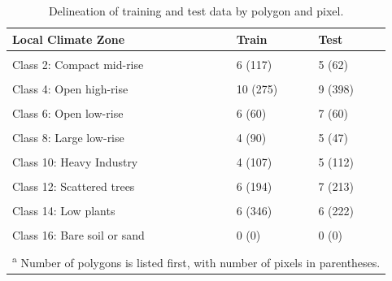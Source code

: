 \documentclass[
]{article}
\begin{document}
\begin{table}[H]

\caption{\label{tab:unnamed-chunk-1}Delineation of training and test data by polygon and pixel.}
\centering
\fontsize{8}{10}\selectfont
\begin{tabular}[t]{lll}
\toprule
Local Climate Zone & Train & Test\\
\midrule
\cellcolor{gray!6}{Class 1: Compact high-rise} & \cellcolor{gray!6}{13        (295)} & \cellcolor{gray!6}{13 (336)}\\
Class 2: Compact mid-rise & 6        (117) & 5 (62)\\
\cellcolor{gray!6}{Class 3: Compact low-rise} & \cellcolor{gray!6}{7        (185)} & \cellcolor{gray!6}{7 (141)}\\
Class 4: Open high-rise & 10        (275) & 9 (398)\\
\cellcolor{gray!6}{Class 5: Open mid-rise} & \cellcolor{gray!6}{4        (79)} & \cellcolor{gray!6}{4 (47)}\\
Class 6: Open low-rise & 6        (60) & 7 (60)\\
\cellcolor{gray!6}{Class 7: Lightweight low-rise} & \cellcolor{gray!6}{0        (0)} & \cellcolor{gray!6}{0 (0)}\\
Class 8: Large low-rise & 4        (90) & 5 (47)\\
\cellcolor{gray!6}{Class 9: Sparsely built} & \cellcolor{gray!6}{0        (0)} & \cellcolor{gray!6}{0 (0)}\\
Class 10: Heavy Industry & 4        (107) & 5 (112)\\
\cellcolor{gray!6}{Class 11: Dense trees} & \cellcolor{gray!6}{7        (762)} & \cellcolor{gray!6}{7 (854)}\\
Class 12: Scattered trees & 6        (194) & 7 (213)\\
\cellcolor{gray!6}{Class 13: Bush, scrub} & \cellcolor{gray!6}{4        (459)} & \cellcolor{gray!6}{5 (232)}\\
Class 14: Low plants & 6        (346) & 6 (222)\\
\cellcolor{gray!6}{Class 15: Bare rock or paved} & \cellcolor{gray!6}{0        (0)} & \cellcolor{gray!6}{0 (0)}\\
Class 16: Bare soil or sand & 0        (0) & 0 (0)\\
\cellcolor{gray!6}{Class 17: Water} & \cellcolor{gray!6}{5        (1266)} & \cellcolor{gray!6}{5 (1113)}\\
\bottomrule
\multicolumn{3}{l}{\textsuperscript{a} Number of polygons is listed first, with number of pixels in parentheses.}\\
\end{tabular}
\end{table}
\end{document}
